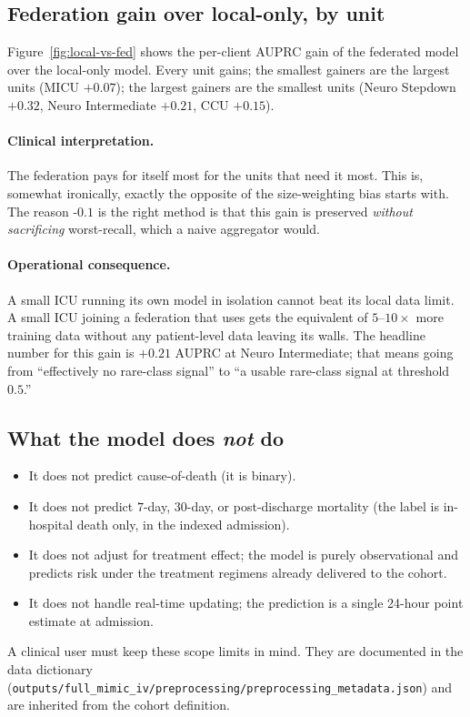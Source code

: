 \subsection{Federation gain over local-only, by unit}
Figure~\ref{fig:local-vs-fed} shows the per-client AUPRC gain of the federated
model over the local-only model. Every unit gains; the smallest gainers are
the largest units (MICU $+0.07$); the largest gainers are the smallest units
(Neuro Stepdown $+0.32$, Neuro Intermediate $+0.21$, CCU $+0.15$).

\paragraph{Clinical interpretation.} The federation pays for itself most for
the units that need it most. This is, somewhat ironically, exactly the
opposite of the size-weighting bias \fedavg{} starts with. The reason
\fedprox{}-$0.1$ is the right method is that this gain is preserved
\emph{without sacrificing} worst-recall, which a naive aggregator would.

\paragraph{Operational consequence.} A small ICU running its own model in
isolation cannot beat its local data limit. A small ICU joining a federation
that uses \fedprox{} gets the equivalent of $5$--$10\!\times$ more training
data without any patient-level data leaving its walls. The headline number for
this gain is $+0.21$ AUPRC at Neuro Intermediate; that means going from
``effectively no rare-class signal'' to ``a usable rare-class signal at
threshold $0.5$.''

\subsection{What the model does \emph{not} do}
\begin{itemize}[leftmargin=*,nosep]
    \item It does not predict cause-of-death (it is binary).
    \item It does not predict $7$-day, $30$-day, or post-discharge mortality
        (the label is in-hospital death only, in the indexed admission).
    \item It does not adjust for treatment effect; the model is purely
        observational and predicts risk under the treatment regimens already
        delivered to the cohort.
    \item It does not handle real-time updating; the prediction is a single
        24-hour point estimate at admission.
\end{itemize}
A clinical user must keep these scope limits in mind. They are documented in
the data dictionary
(\texttt{outputs/full\_mimic\_iv/preprocessing/preprocessing\_metadata.json})
and are inherited from the cohort definition.

